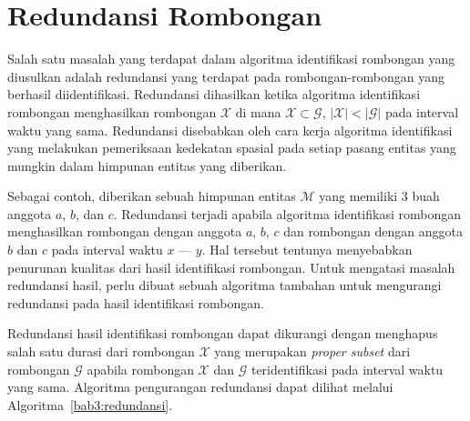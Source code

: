 \section{Redundansi Rombongan}
\label{sec:redundancy}

Salah satu masalah yang terdapat dalam algoritma identifikasi rombongan yang diusulkan adalah redundansi yang terdapat pada rombongan-rombongan yang berhasil diidentifikasi. Redundansi dihasilkan ketika algoritma identifikasi rombongan menghasilkan rombongan $\mathcal{X}$ di mana $\mathcal{X} \subset \mathcal{G}$, $|\mathcal{X}| < |\mathcal{G}|$ pada interval waktu yang sama. Redundansi disebabkan oleh cara kerja algoritma identifikasi yang melakukan pemeriksaan kedekatan spasial pada setiap pasang entitas yang mungkin dalam himpunan entitas yang diberikan.

Sebagai contoh, diberikan sebuah himpunan entitas $\mathcal{M}$ yang memiliki 3 buah anggota $a$, $b$, dan $c$. Redundansi terjadi apabila algoritma identifikasi rombongan menghasilkan rombongan dengan anggota $a$, $b$, $c$ dan rombongan dengan anggota $b$ dan $c$ pada interval waktu $x$ --- $y$. Hal tersebut tentunya menyebabkan penurunan kualitas dari hasil identifikasi rombongan. Untuk mengatasi masalah redundansi hasil, perlu dibuat sebuah algoritma tambahan untuk mengurangi redundansi pada hasil identifikasi rombongan.

Redundansi hasil identifikasi rombongan dapat dikurangi dengan menghapus salah satu durasi dari rombongan $\mathcal{X}$ yang merupakan \textit{proper subset} dari rombongan $\mathcal{G}$ apabila rombongan $\mathcal{X}$ dan $\mathcal{G}$ teridentifikasi pada interval waktu yang sama. Algoritma pengurangan redundansi dapat dilihat melalui Algoritma~\ref{bab3:redundansi}.

